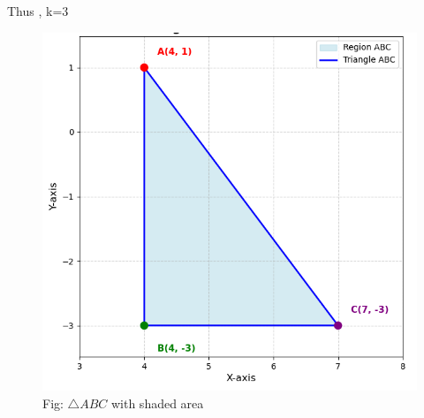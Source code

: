 \documentclass[journal]{IEEEtran}
\begin{document}
Thus , k=3
\begin{figure}[h!]
    \centering
    \includegraphics[width=0.7\columnwidth]{figs/fig.png}
    \caption*{Fig: $\triangle$$ABC$ with shaded area}
    \label{fig:placeholder}
\end{figure}
\end{document}

